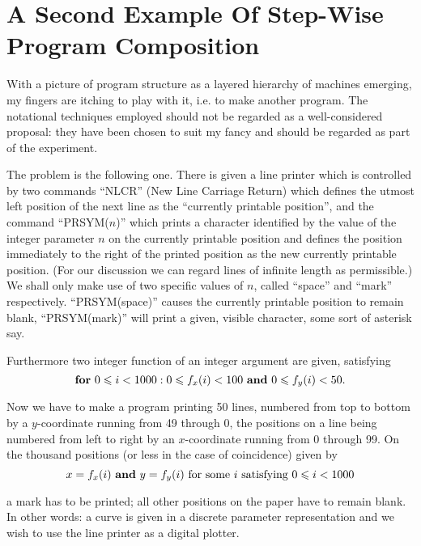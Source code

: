 \section[A second example of step-wise program composition]{A Second Example Of Step-Wise Program Composition}

With a picture of program structure as a layered hierarchy of machines emerging, my fingers are itching to play with it, i.e. to make another program. The notational techniques employed should not be regarded as a well-considered proposal: they have been chosen to suit my fancy and should be regarded as part of the experiment.

The problem is the following one. There is given a line printer which is controlled by two commands ``NLCR'' (New Line Carriage Return) which defines the utmost left position of the next line as the ``currently printable position'', and the command ``PRSYM($n$)'' which prints a character identified by the value of the integer parameter $n$ on the currently printable position and defines the position immediately to the right of the printed position as the new currently printable position. (For our discussion we can regard lines of infinite length as permissible.) We shall only make use of two specific values of $n$, called ``space'' and ``mark'' respectively. ``PRSYM(space)'' causes the currently printable position to remain blank, ``PRSYM(mark)'' will print a given, visible character, some sort of asterisk say.

Furthermore two integer function of an integer argument are given, satisfying
$$
\text{\textbf{for} } 0 \leqslant i < 1000 : 0 \leqslant f_x(i) < 100 \text{ \textbf{and} } 0 \leqslant f_y(i) < 50.
$$

Now we have to make a program printing 50 lines, numbered from top to bottom by a $y$-coordinate running from 49 through 0, the positions on a line being numbered from left to right by an $x$-coordinate running from 0 through 99. On the thousand positions (or less in the case of coincidence) given by
$$
x = f_x(i) \text{ \textbf{and} } y = f_y(i) \text{ for some } i \text{ satisfying } 0 \leqslant i < 1000
$$

\noindent
a mark has to be printed; all other positions on the paper have to remain blank. In other words: a curve is given in a discrete parameter representation and we wish to use the line printer as a digital plotter.


